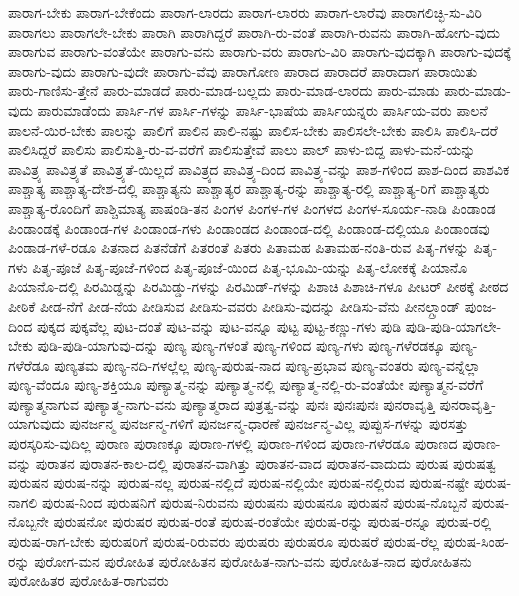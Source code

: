 {ಪಾರಾಗ-ಬೇಕು
ಪಾರಾಗ-ಬೇಕೆಂದು
ಪಾರಾಗ-ಲಾರದು
ಪಾರಾಗ-ಲಾರರು
ಪಾರಾಗ-ಲಾರೆವು
ಪಾರಾಗಲಿಚ್ಛಿ-ಸು-ವಿರಿ
ಪಾರಾಗಲು
ಪಾರಾಗಲೇ-ಬೇಕು
ಪಾರಾಗಿ
ಪಾರಾಗಿದ್ದರೆ
ಪಾರಾಗಿ-ರು-ವಂತೆ
ಪಾರಾಗಿ-ರುವನು
ಪಾರಾಗಿ-ಹೋಗು-ವುದು
ಪಾರಾಗುವ
ಪಾರಾಗು-ವಂತೆಯೇ
ಪಾರಾಗು-ವನು
ಪಾರಾಗು-ವರು
ಪಾರಾಗು-ವಿರಿ
ಪಾರಾಗು-ವುದಕ್ಕಾಗಿ
ಪಾರಾಗು-ವುದಕ್ಕೆ
ಪಾರಾಗು-ವುದು
ಪಾರಾಗು-ವುದೇ
ಪಾರಾಗು-ವೆವು
ಪಾರಾಗೋಣ
ಪಾರಾದ
ಪಾರಾದರೆ
ಪಾರಾದಾಗ
ಪಾರಾಯಿತು
ಪಾರು-ಗಾಣಿಸು-ತ್ತೇನೆ
ಪಾರು-ಮಾಡದೆ
ಪಾರು-ಮಾಡ-ಬಲ್ಲದು
ಪಾರು-ಮಾಡ-ಲಾರದು
ಪಾರು-ಮಾಡು
ಪಾರು-ಮಾಡು-ವುದು
ಪಾರುಮಾಡೆಂದು
ಪಾರ್ಸಿ-ಗಳ
ಪಾರ್ಸಿ-ಗಳನ್ನು
ಪಾರ್ಸಿ-ಭಾಷೆಯ
ಪಾರ್ಸಿಯನ್ನರು
ಪಾರ್ಸಿಯ-ವರು
ಪಾಲನೆ
ಪಾಲನೆ-ಯಿರ-ಬೇಕು
ಪಾಲನ್ನು
ಪಾಲಿಗೆ
ಪಾಲಿನ
ಪಾಲಿ-ನಷ್ಟು
ಪಾಲಿಸ-ಬೇಕು
ಪಾಲಿಸಲೇ-ಬೇಕು
ಪಾಲಿಸಿ
ಪಾಲಿಸಿ-ದರೆ
ಪಾಲಿಸಿದ್ದರೆ
ಪಾಲಿಸು
ಪಾಲಿಸುತ್ತಿ-ರು-ವ-ವರೆಗೆ
ಪಾಲಿಸುತ್ತೇವೆ
ಪಾಲು
ಪಾಲ್
ಪಾಳು-ಬಿದ್ದ
ಪಾಳು-ಮನೆ-ಯನ್ನು
ಪಾವಿತ್ರ್ಯ
ಪಾವಿತ್ರ್ಯತೆ
ಪಾವಿತ್ರ್ಯತೆ-ಯಿಲ್ಲದೆ
ಪಾವಿತ್ರ್ಯದ
ಪಾವಿತ್ರ್ಯ-ದಿಂದ
ಪಾವಿತ್ರ್ಯ-ವನ್ನು
ಪಾಶ-ಗಳಿಂದ
ಪಾಶ-ದಿಂದ
ಪಾಶವಿಕ
ಪಾಶ್ಚಾತ್ಯ
ಪಾಶ್ಚಾತ್ಯ-ದೇಶ-ದಲ್ಲಿ
ಪಾಶ್ಚಾತ್ಯನು
ಪಾಶ್ಚಾತ್ಯರ
ಪಾಶ್ಚಾತ್ಯ-ರನ್ನು
ಪಾಶ್ಚಾತ್ಯ-ರಲ್ಲಿ
ಪಾಶ್ಚಾತ್ಯ-ರಿಗೆ
ಪಾಶ್ಚಾತ್ಯರು
ಪಾಶ್ಚಾತ್ಯ-ರೊಂದಿಗೆ
ಪಾಶ್ಚಿಮಾತ್ಯ
ಪಾಷಂಡಿ-ತನ
ಪಿಂಗಳ
ಪಿಂಗಳ-ಗಳ
ಪಿಂಗಳದ
ಪಿಂಗಳ-ಸೂರ್ಯ-ನಾಡಿ
ಪಿಂಡಾಂಡ
ಪಿಂಡಾಂಡಕ್ಕೆ
ಪಿಂಡಾಂಡ-ಗಳ
ಪಿಂಡಾಂಡ-ಗಳು
ಪಿಂಡಾಂಡದ
ಪಿಂಡಾಂಡ-ದಲ್ಲಿ
ಪಿಂಡಾಂಡ-ದಲ್ಲಿಯೂ
ಪಿಂಡಾಂಡವು
ಪಿಂಡಾಡ-ಗಳೆ-ರಡೂ
ಪಿತನಾದ
ಪಿತನೆಡೆಗೆ
ಪಿತರಂತೆ
ಪಿತರು
ಪಿತಾಮಹ
ಪಿತಾಮಹ-ನಂತಿ-ರುವ
ಪಿತೃ-ಗಳನ್ನು
ಪಿತೃ-ಗಳು
ಪಿತೃ-ಪೂಜೆ
ಪಿತೃ-ಪೂಜೆ-ಗಳಿಂದ
ಪಿತೃ-ಪೂಜೆ-ಯಿಂದ
ಪಿತೃ-ಭೂಮಿ-ಯನ್ನು
ಪಿತೃ-ಲೋಕಕ್ಕೆ
ಪಿಯಾನೊ
ಪಿಯಾನೊ-ದಲ್ಲಿ
ಪಿರಮಿಡ್ಡನ್ನು
ಪಿರಮಿಡ್ಡು-ಗಳನ್ನು
ಪಿರಮಿಡ್-ಗಳನ್ನು
ಪಿಶಾಚಿ
ಪಿಶಾಚಿ-ಗಳೂ
ಪೀಟರ್
ಪೀಠಕ್ಕೆ
ಪೀಠದ
ಪೀಠಿಕೆ
ಪೀಡ-ನೆಗೆ
ಪೀಡ-ನೆಯ
ಪೀಡಿಸುವ
ಪೀಡಿಸು-ವವರು
ಪೀಡಿಸು-ವುದನ್ನು
ಪೀಡಿಸು-ವೆನು
ಪೀನಲ್ಗ್ರಾಂಡ್
ಪುಂಜ-ದಿಂದ
ಪುಕ್ಕದ
ಪುಕ್ಕವೆಲ್ಲ
ಪುಟ-ದಂತೆ
ಪುಟ-ವನ್ನು
ಪುಟ-ವನ್ನೂ
ಪುಟ್ಟ
ಪುಟ್ಟ-ಕಣ್ಣು-ಗಳು
ಪುಡಿ
ಪುಡಿ-ಪುಡಿ-ಯಾಗಲೇ-ಬೇಕು
ಪುಡಿ-ಪುಡಿ-ಯಾಗುವು-ದನ್ನು
ಪುಣ್ಯ
ಪುಣ್ಯ-ಗಳಂತೆ
ಪುಣ್ಯ-ಗಳಿಂದ
ಪುಣ್ಯ-ಗಳು
ಪುಣ್ಯ-ಗಳೆರಡಕ್ಕೂ
ಪುಣ್ಯ-ಗಳೆರೆಡೂ
ಪುಣ್ಯತಮ
ಪುಣ್ಯ-ನದಿ-ಗಳಲ್ಲೆಲ್ಲ
ಪುಣ್ಯ-ಪುರುಷ-ನಾದ
ಪುಣ್ಯ-ಪ್ರಭಾವ
ಪುಣ್ಯ-ವಂತರು
ಪುಣ್ಯ-ವನ್ನೆಲ್ಲಾ
ಪುಣ್ಯ-ವೆಂದೂ
ಪುಣ್ಯ-ಶಕ್ತಿಯೂ
ಪುಣ್ಯಾತ್ಮ-ನನ್ನು
ಪುಣ್ಯಾತ್ಮ-ನಲ್ಲಿ
ಪುಣ್ಯಾತ್ಮ-ನಲ್ಲಿ-ರು-ವಂತೆಯೇ
ಪುಣ್ಯಾತ್ಮನ-ವರೆಗೆ
ಪುಣ್ಯಾತ್ಮನಾಗುವ
ಪುಣ್ಯಾತ್ಮ-ನಾಗು-ವನು
ಪುಣ್ಯಾತ್ಮರಾದ
ಪುತ್ರತ್ವ-ವನ್ನು
ಪುನಃ
ಪುನಃಪುನಃ
ಪುನರಾವೃತ್ತಿ
ಪುನರಾವೃತ್ತಿ-ಯಾಗುವುದು
ಪುನರ್ಜನ್ಮ
ಪುನರ್ಜನ್ಮ-ಗಳಿಗೆ
ಪುನರ್ಜನ್ಮ-ಧಾರಣೆ
ಪುನರ್ಜನ್ಮ-ವಿಲ್ಲ
ಪುಪ್ಪುಸ-ಗಳನ್ನು
ಪುರಸತ್ತು
ಪುರಸ್ಕರಿಸು-ವುದಿಲ್ಲ
ಪುರಾಣ
ಪುರಾಣಕ್ಕೂ
ಪುರಾಣ-ಗಳಲ್ಲಿ
ಪುರಾಣ-ಗಳಿಂದ
ಪುರಾಣ-ಗಳೆರಡೂ
ಪುರಾಣದ
ಪುರಾಣ-ವನ್ನು
ಪುರಾತನ
ಪುರಾತನ-ಕಾಲ-ದಲ್ಲಿ
ಪುರಾತನ-ವಾಗಿತ್ತು
ಪುರಾತನ-ವಾದ
ಪುರಾತನ-ವಾದುದು
ಪುರುಷ
ಪುರುಷತ್ವ
ಪುರುಷನ
ಪುರುಷ-ನನ್ನು
ಪುರುಷ-ನಲ್ಲ
ಪುರುಷ-ನಲ್ಲಿದೆ
ಪುರುಷ-ನಲ್ಲಿಯೇ
ಪುರುಷ-ನಲ್ಲಿರುವ
ಪುರುಷ-ನಷ್ಟೇ
ಪುರುಷ-ನಾಗಲಿ
ಪುರುಷ-ನಿಂದ
ಪುರುಷನಿಗೆ
ಪುರುಷ-ನಿರುವನು
ಪುರುಷನು
ಪುರುಷನೂ
ಪುರುಷನೆ
ಪುರುಷ-ನೊಬ್ಬನೆ
ಪುರುಷ-ನೊಬ್ಬನೇ
ಪುರುಷನೋ
ಪುರುಷರ
ಪುರುಷ-ರಂತೆ
ಪುರುಷ-ರಂತೆಯೇ
ಪುರುಷ-ರನ್ನು
ಪುರುಷ-ರನ್ನೂ
ಪುರುಷ-ರಲ್ಲಿ
ಪುರುಷ-ರಾಗ-ಬೇಕು
ಪುರುಷರಿಗೆ
ಪುರುಷ-ರಿರುವರು
ಪುರುಷರು
ಪುರುಷರೂ
ಪುರುಷರೆ
ಪುರುಷ-ರೆಲ್ಲ
ಪುರುಷ-ಸಿಂಹ-ರನ್ನು
ಪುರೋಗ-ಮನ
ಪುರೋಹಿತ
ಪುರೋಹಿತನ
ಪುರೋಹಿತ-ನಾಗು-ವನು
ಪುರೋಹಿತ-ನಾದ
ಪುರೋಹಿತನು
ಪುರೋಹಿತರ
ಪುರೋಹಿತ-ರಾಗುವರು
}
